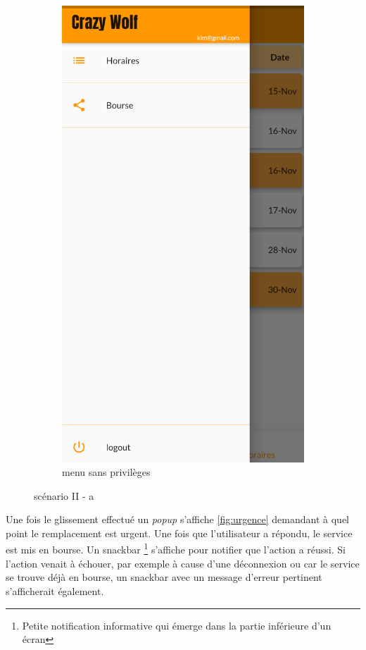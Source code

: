 \begin{figure}[!h]
\begin{subfigure}{.3\textwidth}
            \includegraphics[width=0.9\linewidth]{screenshots/scenario_02/menu_serveur_normal.png}
            \caption{menu sans privilèges}
            \label{fig:menu_sans_droits}
        \end{subfigure}
        \caption{scénario II - a}
        \label{fig:scen02a}
    \end{figure}

Une fois le glissement effectué un \textit{popup} s'affiche \ref{fig:urgence} demandant
à quel point le remplacement est urgent. Une fois que l'utilisateur a répondu, le service est mis
en bourse. Un snackbar \footnote{Petite notification informative qui émerge dans la partie inférieure d'un écran} s'affiche pour notifier que l'action a réussi.
Si l'action venait à échouer, par exemple à cause d'une déconnexion ou car le service se trouve déjà en bourse, un snackbar avec un message 
d'erreur pertinent s'afficherait également.

